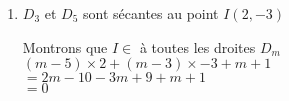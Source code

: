 \begin{enumerate}
\begin{enumerate}
\begin{minipage}{9.6cm}
$D_3 :$  
\begin{center}             
  {white}{$x=2$}
\end{center}                          
        \end{minipage}        
\end{enumerate} 

\item $D_3$ et $D_5$ sont sécantes au point $I(2,-3)$

Montrons que $I\in$ à toutes les droites $D_m$ \\

$(m-5)\times 2 + (m-3) \times -3 + m +1 $\\
$= 2m -10 -3m +9 +m +1 $\\
$= 0$ \\ 
     
\end{enumerate}
